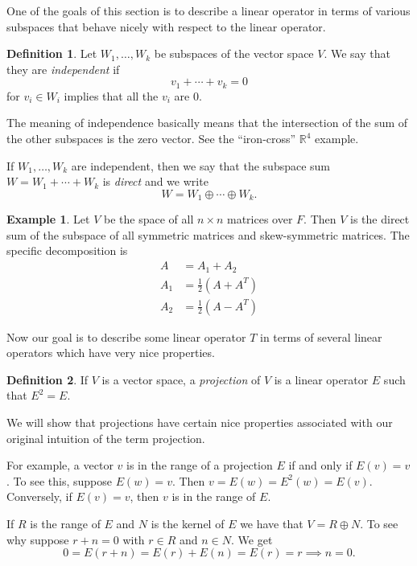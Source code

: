 \documentclass[12pt]{article}
\theoremstyle{plain}
\theoremstyle{definition}
\newtheorem{defn}{Definition}
\newtheorem{example}{Example}
\begin{document}
One of the goals of this section is to describe a linear operator in terms of various subspaces that behave nicely with respect to the linear operator.

\begin{defn}
Let $W_1, \dotsc, W_k$ be subspaces of the vector space $V$. We say that they are \textit{independent} if 
\[v_1 + \cdots + v_k = 0\] for $v_i \in W_i$ implies that all the $v_i$ are $0$.
\end{defn}

The meaning of independence basically means that the intersection of the sum of the other subspaces is the zero vector. See the ``iron-cross'' $\mathbb{R}^4$ example.

If $W_1, \dotsc, W_k$ are independent, then we say that the subspace sum $W = W_1 + \cdots + W_k$ is \textit{direct} and we write
\[W = W_1 \oplus \cdots \oplus W_k.\]

\begin{example}
Let $V$ be the space of all $n \times n$ matrices over $F$. Then $V$ is the direct sum of the subspace of all symmetric matrices and skew-symmetric matrices. The specific decomposition is
\begin{align*}
A &= A_1 + A_2 \\
	 A_1 &= \frac{1}{2}(A + A^T) \\
	 A_2 &= \frac{1}{2}(A - A^T)
\end{align*}
\end{example}

Now our goal is to describe some linear operator $T$ in terms of several linear operators which have very nice properties.

\begin{defn}
If $V$ is a vector space, a \textit{projection} of $V$ is a linear operator $E$ such that $E^2 = E$.
\end{defn}

We will show that projections have certain nice properties associated with our original intuition of the term projection.

For example, a vector $v$ is in the range of a projection $E$ if and only if $E(v) = v$. To see this, suppose $E(w) = v$. Then $v = E(w) = E^2(w) = E(v)$. Conversely, if $E(v) = v$, then $v$ is in the range of $E$. 

If $R$ is the range of $E$ and $N$ is the kernel of $E$ we have that $V = R \oplus N$. To see why suppose $r + n = 0$ with $r \in R$ and $n \in N$. We get 
\[0 = E(r + n) = E(r) + E(n) = E(r) = r \implies n = 0.\]
\end{document}
